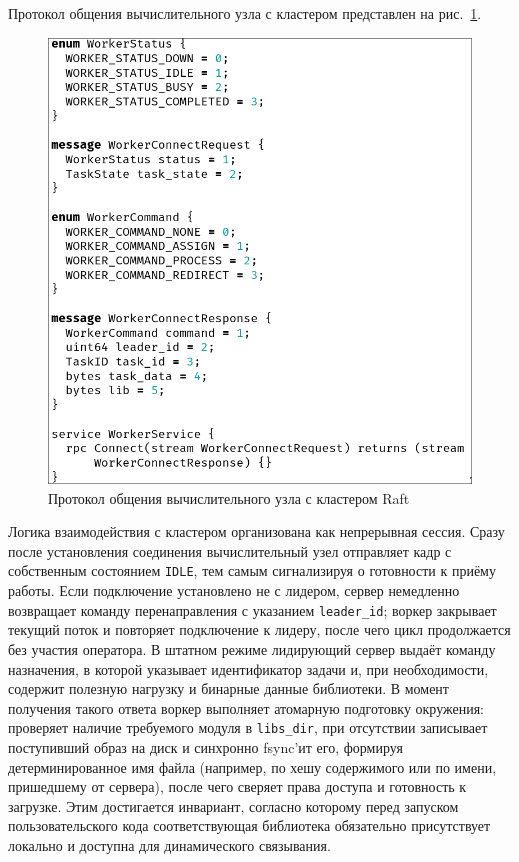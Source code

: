 Протокол общения вычислительного узла с кластером представлен на
рис.~\ref{fig:worker_proto}.

\begin{figure}
  \centering
  \includegraphics[scale=0.4]{inc/worker-proto.png}
  \caption{Протокол общения вычислительного узла с кластером Raft}
  \label{fig:worker_proto}
\end{figure}

Логика взаимодействия с кластером организована как непрерывная сессия. Сразу
после установления соединения вычислительный узел отправляет кадр с собственным
состоянием \texttt{IDLE}, тем самым сигнализируя о готовности к приёму работы.
Если подключение установлено не с лидером, сервер немедленно возвращает команду
перенаправления с указанием \texttt{leader\_id}; воркер закрывает текущий поток
и повторяет подключение к лидеру, после чего цикл продолжается без участия
оператора. В штатном режиме лидирующий сервер выдаёт команду назначения, в
которой указывает идентификатор задачи и, при необходимости, содержит полезную
нагрузку и бинарные данные библиотеки. В момент получения такого ответа воркер
выполняет атомарную подготовку окружения: проверяет наличие требуемого модуля в
\texttt{libs\_dir}, при отсутствии записывает поступивший образ на диск и
синхронно fsync’ит его, формируя детерминированное имя файла (например, по хешу
содержимого или по имени, пришедшему от сервера), после чего сверяет права
доступа и готовность к загрузке. Этим достигается инвариант, согласно которому
перед запуском пользовательского кода соответствующая библиотека обязательно
присутствует локально и доступна для динамического связывания.

